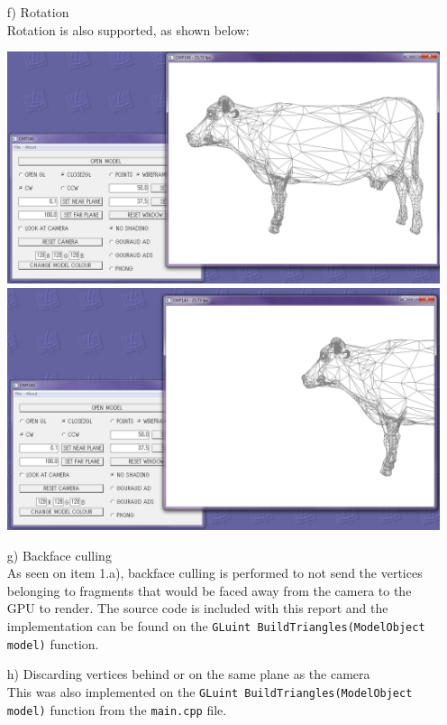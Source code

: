 \documentclass[12pt]{article}
\begin{document}
\begin{itemize}
\begin{itemize}
\item[f)] Rotation\\
Rotation is also supported, as shown below:
\begin{center}
\includegraphics[scale=0.4]{8.png}
\includegraphics[scale=0.4]{11.png}
\end{center}

\item[g)] Backface culling\\
As seen on item 1.a), backface culling is performed to not send the vertices belonging to fragments that would be faced away from the camera to the GPU to render. The source code is included with this report and the implementation can be found on the \texttt{GLuint BuildTriangles(ModelObject model)} function. 

\item[h)] Discarding vertices behind or on the same plane as the camera\\
This was also implemented on the \texttt{GLuint BuildTriangles(ModelObject model)} function from the \texttt{main.cpp} file.


\end{itemize}
\end{itemize}
\end{document}
